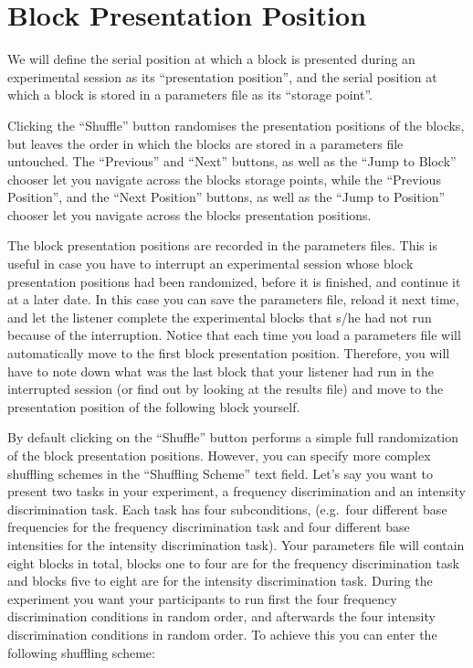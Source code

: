\documentclass[a4paper,12pt,english]{sphinxmanual}
\begin{document}
\section{Block Presentation Position}
\label{engine:sec-shuffling}\label{engine:block-presentation-position}
We will define the serial position at which a block is presented during
an experimental session as its “presentation position”, and the serial
position at which a block is stored in a parameters file as its “storage
point”.

Clicking the “Shuffle” button randomises the presentation positions of
the blocks, but leaves the order in which the blocks are stored in a
parameters file untouched. The “Previous” and “Next” buttons, as well as
the “Jump to Block” chooser let you navigate across the blocks storage
points, while the “Previous Position”, and the “Next Position” buttons,
as well as the “Jump to Position” chooser let you navigate across the
blocks presentation positions.

The block presentation positions are recorded in the parameters files.
This is useful in case you have to interrupt an experimental session
whose block presentation positions had been randomized, before it is
finished, and continue it at a later date. In this case you can save the
parameters file, reload it next time, and let the listener complete the
experimental blocks that s/he had not run because of the interruption.
Notice that each time you load a parameters file  will
automatically move to the first block presentation position. Therefore,
you will have to note down what was the last block that your listener
had run in the interrupted session (or find out by looking at the
results file) and move to the presentation position of the following
block yourself.

By default clicking on the “Shuffle” button performs a simple full
randomization of the block presentation positions. However, you can
specify more complex shuffling schemes in the “Shuffling Scheme” text
field. Let’s say you want to present two tasks in your experiment, a
frequency discrimination and an intensity discrimination task. Each task
has four subconditions, (e.g. four different base frequencies for the
frequency discrimination task and four different base intensities for
the intensity discrimination task). Your parameters file will contain
eight blocks in total, blocks one to four are for the frequency
discrimination task and blocks five to eight are for the intensity
discrimination task. During the experiment you want your participants to
run first the four frequency discrimination conditions in random order,
and afterwards the four intensity discrimination conditions in random
order. To achieve this you can enter the following shuffling scheme:
\end{document}
